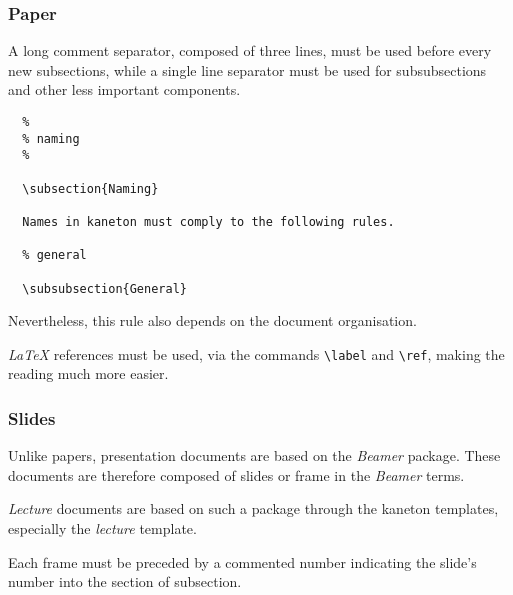 
\subsubsection{Paper}

A long comment separator, composed of three lines, must be used before
every new subsections, while a single line separator must be used for
subsubsections and other less important components.

\begin{verbatim}
  %
  % naming
  %

  \subsection{Naming}

  Names in kaneton must comply to the following rules.

  % general

  \subsubsection{General}
\end{verbatim}

Nevertheless, this rule also depends on the document organisation.

\textit{\LaTeX} references must be used, via the commands \verb|\label| and
\verb|\ref|, making the reading much more easier.


\subsubsection{Slides}

Unlike papers, presentation documents are based on the \textit{Beamer} package.
These documents are therefore composed of slides or frame in the
\textit{Beamer} terms.

\textit{Lecture} documents are based on such a package through the kaneton
templates, especially the \textit{lecture} template.

Each frame must be preceded by a commented number indicating the slide's
number into the section of subsection.

